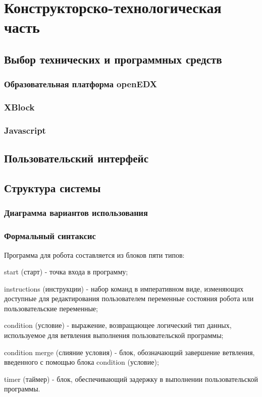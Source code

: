 \chapter{Конструкторско-технологическая часть}

\section{Выбор технических и программных средств}
\subsection{Образовательная платформа openEDX}
\subsection{XBlock}
\subsection{Javascript}
\section{Пользовательский интерфейс}
\section{Структура системы}
\subsection{Диаграмма вариантов использования}
\subsection{Формальный синтаксис}
Программа для робота составляется из блоков пяти типов:
\begin{itemize*}
	\item start (старт) - точка входа в программу;
	\item instructions (инструкции) - набор команд в императивном виде, изменяющих доступные для редактирования пользователем переменные состояния робота или пользовательские переменные;
	\item condition (условие) - выражение, возвращающее логический тип данных, используемое для ветвления выполнения пользовательской программы;
	\item condition merge (слияние условия) - блок, обозначающий завершение ветвления, введенного с помощью блока condition (условие);
	\item timer (таймер) - блок, обеспечивающий задержку в выполнении пользовательской программы.
\end{itemize*}

